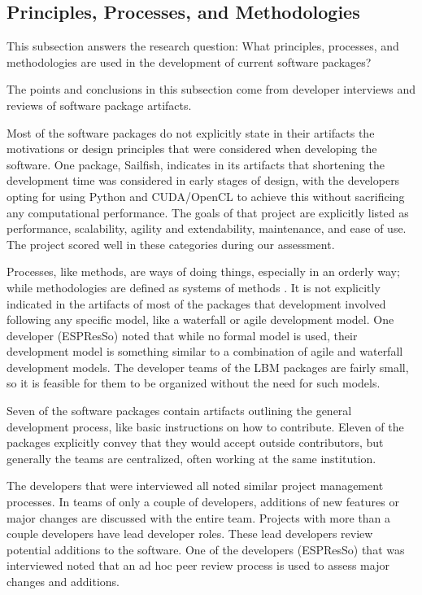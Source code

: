 \documentclass[12pt, notitlepage]{article}
\begin{document}
\subsection{Principles, Processes, and Methodologies}\label{prinprocmeth}

This subsection answers the research question: What principles, processes, and methodologies are used in the development of current software packages?

The points and conclusions in this subsection come from developer interviews and reviews of software package artifacts.

Most of the software packages do not explicitly state in their artifacts the motivations or design principles that were considered when developing the software. One package, Sailfish, indicates in its artifacts that shortening the development time was considered in early stages of design, with the developers opting for using Python and CUDA/OpenCL to achieve this without sacrificing any computational performance. The goals of that project are explicitly listed as performance, scalability, agility and extendability, maintenance, and ease of use. The project scored well in these categories during our assessment.

Processes, like methods, are ways of doing things, especially in an orderly way; while methodologies are defined as systems of methods \citep{ghezzi1991fundamentals}. It is not explicitly indicated in the artifacts of most of the packages that development involved following any specific model, like a waterfall or agile development model. One developer (ESPResSo) noted that while no formal model is used, their development model is something similar to a combination of agile and waterfall development models. The developer teams of the LBM packages are fairly small, so it is feasible for them to be organized without the need for such models. 

Seven of the software packages contain artifacts outlining the general development process, like basic instructions on how to contribute. Eleven of the packages explicitly convey that they would accept outside contributors, but generally the teams are centralized, often working at the same institution. 

The developers that were interviewed all noted similar project management processes. In teams of only a couple of developers, additions of new features or major changes are discussed with the entire team. Projects with more than a couple developers have lead developer roles. These lead developers review potential additions to the software. One of the developers (ESPResSo) that was interviewed noted that an ad hoc peer review process is used to assess major changes and additions.
\end{document}
